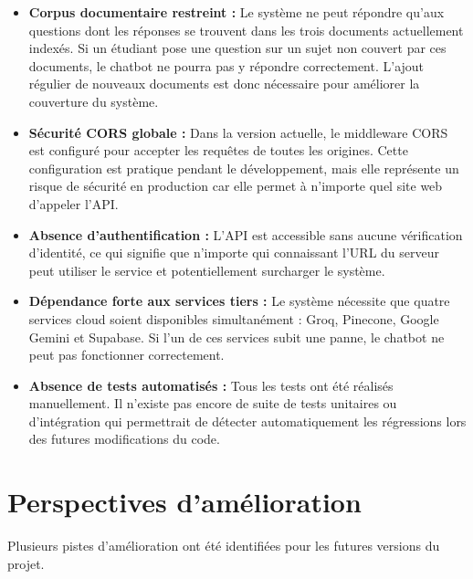\documentclass[12pt, a4paper, twoside]{report}
\begin{document}
\begin{itemize}[label=\bullet]
    \item \textbf{Corpus documentaire restreint :} Le système ne peut répondre qu'aux questions dont les réponses se trouvent dans les trois documents actuellement indexés. Si un étudiant pose une question sur un sujet non couvert par ces documents, le chatbot ne pourra pas y répondre correctement. L'ajout régulier de nouveaux documents est donc nécessaire pour améliorer la couverture du système.
    \item \textbf{Sécurité CORS globale :} Dans la version actuelle, le middleware CORS est configuré pour accepter les requêtes de toutes les origines. Cette configuration est pratique pendant le développement, mais elle représente un risque de sécurité en production car elle permet à n'importe quel site web d'appeler l'API.
    \item \textbf{Absence d'authentification :} L'API est accessible sans aucune vérification d'identité, ce qui signifie que n'importe qui connaissant l'URL du serveur peut utiliser le service et potentiellement surcharger le système.
    \item \textbf{Dépendance forte aux services tiers :} Le système nécessite que quatre services cloud soient disponibles simultanément : Groq, Pinecone, Google Gemini et Supabase. Si l'un de ces services subit une panne, le chatbot ne peut pas fonctionner correctement.
    \item \textbf{Absence de tests automatisés :} Tous les tests ont été réalisés manuellement. Il n'existe pas encore de suite de tests unitaires ou d'intégration qui permettrait de détecter automatiquement les régressions lors des futures modifications du code.
\end{itemize}

\section{Perspectives d'amélioration}
Plusieurs pistes d'amélioration ont été identifiées pour les futures versions du projet.
\end{document}
